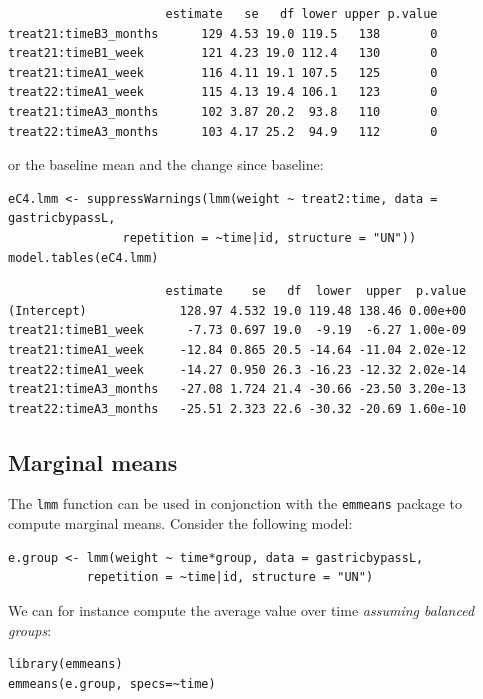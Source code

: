 \documentclass[12pt]{article}
\begin{document}
\begin{verbatim}
                      estimate   se   df lower upper p.value
treat21:timeB3_months      129 4.53 19.0 119.5   138       0
treat21:timeB1_week        121 4.23 19.0 112.4   130       0
treat21:timeA1_week        116 4.11 19.1 107.5   125       0
treat22:timeA1_week        115 4.13 19.4 106.1   123       0
treat21:timeA3_months      102 3.87 20.2  93.8   110       0
treat22:timeA3_months      103 4.17 25.2  94.9   112       0
\end{verbatim}


or the baseline mean and the change since baseline:
\lstset{language=r,label= ,caption= ,captionpos=b,numbers=none}
\begin{lstlisting}
eC4.lmm <- suppressWarnings(lmm(weight ~ treat2:time, data = gastricbypassL,
				repetition = ~time|id, structure = "UN"))
model.tables(eC4.lmm)
\end{lstlisting}

\begin{verbatim}
                      estimate    se   df  lower  upper  p.value
(Intercept)             128.97 4.532 19.0 119.48 138.46 0.00e+00
treat21:timeB1_week      -7.73 0.697 19.0  -9.19  -6.27 1.00e-09
treat21:timeA1_week     -12.84 0.865 20.5 -14.64 -11.04 2.02e-12
treat22:timeA1_week     -14.27 0.950 26.3 -16.23 -12.32 2.02e-14
treat21:timeA3_months   -27.08 1.724 21.4 -30.66 -23.50 3.20e-13
treat22:timeA3_months   -25.51 2.323 22.6 -30.32 -20.69 1.60e-10
\end{verbatim}

\subsection{Marginal means}
\label{sec:orgfbe25d5}

The \texttt{lmm} function can be used in conjonction with the \texttt{emmeans}
package to compute marginal means. Consider the following model:
\lstset{language=r,label= ,caption= ,captionpos=b,numbers=none}
\begin{lstlisting}
e.group <- lmm(weight ~ time*group, data = gastricbypassL,
	       repetition = ~time|id, structure = "UN")
\end{lstlisting}

We can for instance compute the average value over time \emph{assuming balanced groups}:
\lstset{language=r,label= ,caption= ,captionpos=b,numbers=none}
\begin{lstlisting}
library(emmeans)
emmeans(e.group, specs=~time)
\end{lstlisting}
\end{document}
